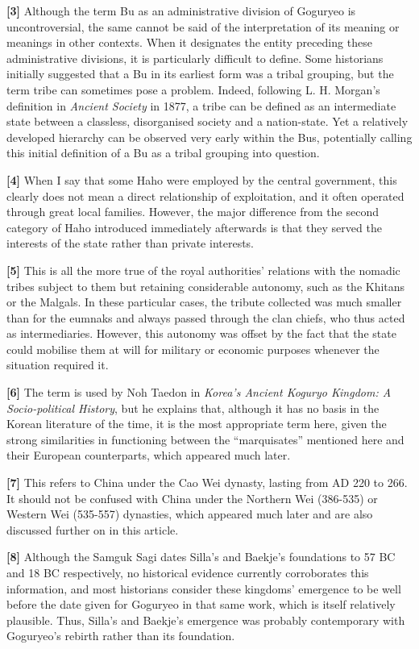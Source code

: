 \documentclass[11pt,a4paper]{article}
\begin{document}
\textbf{{[}3{]}} Although the term Bu as an administrative division of Goguryeo is uncontroversial, the same cannot be said of the interpretation of its meaning or meanings in other contexts. When it designates the entity preceding these administrative divisions, it is particularly difficult to define. Some historians initially suggested that a Bu in its earliest form was a tribal grouping, but the term tribe can sometimes pose a problem. Indeed, following L. H. Morgan's definition in \emph{Ancient Society} in 1877, a tribe can be defined as an intermediate state between a classless, disorganised society and a nation-state. Yet a relatively developed hierarchy can be observed very early within the Bus, potentially calling this initial definition of a Bu as a tribal grouping into question.

\textbf{{[}4{]}} When I say that some Haho were employed by the central government, this clearly does not mean a direct relationship of exploitation, and it often operated through great local families. However, the major difference from the second category of Haho introduced immediately afterwards is that they served the interests of the state rather than private interests.

\textbf{{[}5{]}} This is all the more true of the royal authorities' relations with the nomadic tribes subject to them but retaining considerable autonomy, such as the Khitans or the Malgals. In these particular cases, the tribute collected was much smaller than for the eumnaks and always passed through the clan chiefs, who thus acted as intermediaries. However, this autonomy was offset by the fact that the state could mobilise them at will for military or economic purposes whenever the situation required it.

\textbf{{[}6{]}} The term is used by Noh Taedon in \emph{Korea's Ancient Koguryo Kingdom: A Socio-political History}, but he explains that, although it has no basis in the Korean literature of the time, it is the most appropriate term here, given the strong similarities in functioning between the ``marquisates'' mentioned here and their European counterparts, which appeared much later.

\textbf{{[}7{]}} This refers to China under the Cao Wei dynasty, lasting from AD 220 to 266. It should not be confused with China under the Northern Wei (386-535) or Western Wei (535-557) dynasties, which appeared much later and are also discussed further on in this article.

\textbf{{[}8{]}} Although the Samguk Sagi dates Silla's and Baekje's foundations to 57 BC and 18 BC respectively, no historical evidence currently corroborates this information, and most historians consider these kingdoms' emergence to be well before the date given for Goguryeo in that same work, which is itself relatively plausible. Thus, Silla's and Baekje's emergence was probably contemporary with Goguryeo's rebirth rather than its foundation.
\end{document}
